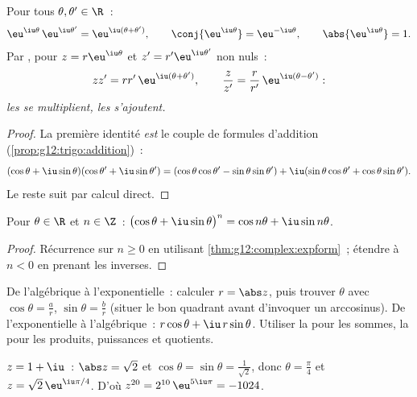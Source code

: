 \begin{theorem}\label{thm:g12:complex:expform}
Pour tous $\theta, \theta' \in \R$~:
\[
\eu^{\iu\theta}\,\eu^{\iu\theta'} = \eu^{\iu(\theta + \theta')},
\qquad
\conj{\eu^{\iu\theta}} = \eu^{-\iu\theta},
\qquad
\abs{\eu^{\iu\theta}} = 1 .
\]
Par , pour $z = r\eu^{\iu\theta}$ et $z' = r'\eu^{\iu\theta'}$
non nuls~:
\[
zz' = rr'\,\eu^{\iu(\theta+\theta')},
\qquad
\frac{z}{z'} = \frac{r}{r'}\,\eu^{\iu(\theta - \theta')} :
\]
\emph{les  se multiplient, les  s'ajoutent.}
\end{theorem}

\begin{proof}
La première identité \emph{est} le couple de formules d'addition
(\cref{prop:g12:trigo:addition})~:
\[
(\cos\theta + \iu\sin\theta)(\cos\theta' + \iu\sin\theta')
= (\cos\theta\cos\theta' - \sin\theta\sin\theta')
+ \iu(\sin\theta\cos\theta' + \cos\theta\sin\theta').
\]
Le reste suit par calcul direct.
\end{proof}

\begin{corollary}\label{cor:g12:complex:demoivre}
Pour $\theta \in \R$ et $n \in \Z$~:
$\bigl(\cos\theta + \iu\sin\theta\bigr)^n = \cos n\theta + \iu \sin n\theta$.
\end{corollary}

\begin{proof}
Récurrence sur $n \geq 0$ en utilisant \cref{thm:g12:complex:expform}~;
étendre à $n < 0$ en prenant les inverses.
\end{proof}

\begin{method}\label{met:g12:complex:forms}
De l'algébrique à l'exponentielle~: calculer $r = \abs z$, puis trouver
$\theta$ avec $\cos\theta = \frac ar$, $\sin\theta = \frac br$ (situer le
bon quadrant avant d'invoquer un arccosinus). De l'exponentielle à
l'algébrique~:  $r\cos\theta + \iu\, r\sin\theta$. Utiliser la
 pour les sommes, la  pour les produits,
puissances et quotients.
\end{method}

\begin{example}
$z = 1 + \iu$~: $\abs z = \sqrt2$ et $\cos\theta = \sin\theta =
\frac{1}{\sqrt2}$, donc $\theta = \frac\pi4$ et $z = \sqrt2\,\eu^{\iu\pi/4}$.
D'où $z^{20} = 2^{10}\,\eu^{5\iu\pi} = -1024$.
\end{example}

